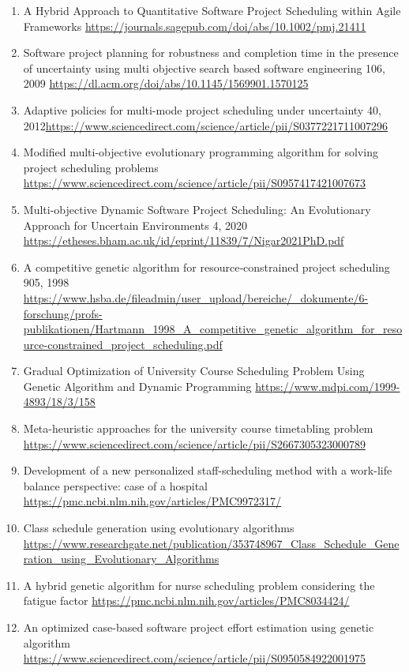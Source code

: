 \documentclass[a4paper,12pt]{article}
\begin{document}
\begin{enumerate}
  \item A Hybrid Approach to Quantitative Software Project Scheduling within Agile Frameworks \url{https://journals.sagepub.com/doi/abs/10.1002/pmj.21411}
  \item Software project planning for robustness and completion time in the presence of uncertainty using multi objective search based software engineering 106, 2009 \url{https://dl.acm.org/doi/abs/10.1145/1569901.1570125}
  \item Adaptive policies for multi-mode project scheduling under uncertainty 40, 2012\url{https://www.sciencedirect.com/science/article/pii/S0377221711007296}
  \item Modified multi-objective evolutionary programming algorithm for solving project scheduling problems \url{https://www.sciencedirect.com/science/article/pii/S0957417421007673}
  \item Multi-objective Dynamic Software Project Scheduling: An Evolutionary Approach for Uncertain Environments 4, 2020 \url{https://etheses.bham.ac.uk/id/eprint/11839/7/Nigar2021PhD.pdf}
  \item A competitive genetic algorithm for resource‐constrained project scheduling 905, 1998 \url{https://www.hsba.de/fileadmin/user_upload/bereiche/_dokumente/6-forschung/profs-publikationen/Hartmann_1998_A_competitive_genetic_algorithm_for_resource-constrained_project_scheduling.pdf}
  \item Gradual Optimization of University Course Scheduling Problem Using Genetic Algorithm and Dynamic Programming \url{https://www.mdpi.com/1999-4893/18/3/158}
  \item Meta-heuristic approaches for the university course timetabling problem \url{https://www.sciencedirect.com/science/article/pii/S2667305323000789}
  \item Development of a new personalized staff-scheduling method with a work-life balance perspective: case of a hospital \url{https://pmc.ncbi.nlm.nih.gov/articles/PMC9972317/}
  \item Class schedule generation using evolutionary algorithms \url{https://www.researchgate.net/publication/353748967_Class_Schedule_Generation_using_Evolutionary_Algorithms}
  \item A hybrid genetic algorithm for nurse scheduling problem considering the fatigue factor \url{https://pmc.ncbi.nlm.nih.gov/articles/PMC8034424/}
  \item An optimized case-based software project effort estimation using genetic algorithm \url{https://www.sciencedirect.com/science/article/pii/S0950584922001975}

\end{enumerate}
\end{document}
